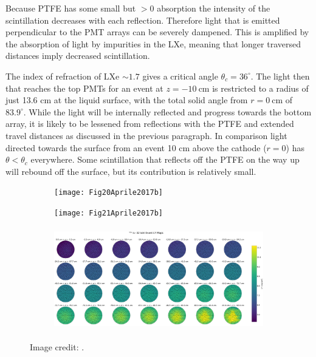Because PTFE has some small but $> 0$ absorption the intensity of the scintillation decreases with each reflection.  Therefore light
that is emitted perpendicular to the PMT arrays can be severely dampened.  This is amplified by the absorption of light by
impurities in the LXe, meaning that longer traversed distances imply decreased scintillation.

The index of refraction of LXe ${\sim} 1.7$
gives a critical angle $\theta_c = 36^{\circ}$.  The light then that reaches the top PMTs for an event at
$z = -10\ \mathrm{cm}$ is restricted to a radius of just 13.6 cm at the liquid surface, with the total solid angle from
$r = 0\ \mathrm{cm}$ of $83.9^{\circ}$.  While the light will be internally reflected and progress towards the bottom array, it is likely
to be lessened from reflections with the PTFE and extended travel distances as discussed in the previous paragraph. In comparison light
directed towards the surface from an event 10 cm above the cathode ($r = 0$)
has $\theta < \theta_c$ everywhere.  Some scintillation that reflects off the PTFE on the way up will rebound off the surface, but its
contribution is relatively small.

\begin{figure}
    \centering
    \begin{subfigure}[t]{0.45\textwidth}
        \centering
        \texttt{[image: Fig20Aprile2017b]}
        \label{fig:calibrations_lce_lce_hist}
    \end{subfigure}%
    \begin{subfigure}[t]{0.45\textwidth}
        \centering
        \texttt{[image: Fig21Aprile2017b]} \\
        \label{fig:calibrations_lce_cle_map}
    \end{subfigure}
    \begin{subfigure}[b]{\textwidth}
        \centering
        \includegraphics[height=4.5cm]{LCEMapPolar}
        \label{fig:calibrations_lce_cle_map}
    \end{subfigure}
    \caption{Image credit: .}
	\label{fig:calibrations_lce_lce}
\end{figure}

